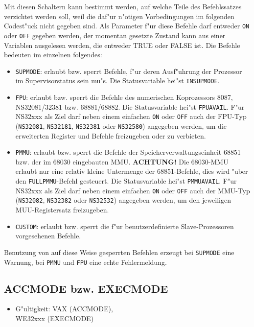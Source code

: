 \documentclass[12pt,a4paper,twoside]{report}
\makeatletter
\newcommand{\bb}[1]{{\bf #1}}
\newcommand{\tty}[1]{{\tt #1}}
\newcommand{\ttindex}[1]{\index{#1@{\tt #1}}}
\makeatother
\begin{document}
Mit diesen Schaltern kann bestimmt werden, auf welche Teile des
Befehlssatzes verzichtet werden soll, weil die daf"ur n"otigen
Vorbedingungen im folgenden Codest"uck nicht gegeben sind.  Als
Parameter f"ur diese Befehle darf entweder \tty{ON} oder \tty{OFF} gegeben werden,
der momentan gesetzte Zustand kann aus einer Variablen ausgelesen
werden, die entweder TRUE oder FALSE ist.  Die Befehle bedeuten im einzelnen
folgendes:
\begin{itemize}
\item{\tty{SUPMODE}: erlaubt bzw. sperrt Befehle, f"ur deren Ausf"uhrung
      der Prozessor im Supervisorstatus sein mu"s.  Die Statusvariable
      hei"st \tty{INSUPMODE}.}
\item{\tty{FPU}: erlaubt bzw. sperrt die Befehle des numerischen Koprozessors
      8087, NS32081/32381 bzw. 68881/68882.  Die Statusvariable hei"st \tty{FPUAVAIL}.
      F"ur NS32xxx als Ziel darf neben einem einfachen \tty{ON} oder \tty{OFF}
      auch der FPU-Typ (\tty{NS32081}, \tty{NS32181}, \tty{NS32381} oder \tty{NS32580})
      angegeben werden, um die erweiterten Register und Befehle freizugeben oder
      zu verbieten.}
\item{\tty{PMMU}: erlaubt bzw. sperrt die Befehle der Speicherverwaltungseinheit
      68851 bzw. der im 68030 eingebauten MMU.  \bb{ACHTUNG!} Die 68030-MMU
      erlaubt nur eine relativ kleine Untermenge der 68851-Befehle, dies wird
      "uber den \tty{FULLPMMU}-Befehl gesteuert.  Die Statusvariable hei"st
      \tty{PMMUAVAIL}. F"ur NS32xxx als Ziel darf neben einem einfachen \tty{ON}
      oder \tty{OFF} auch der MMU-Typ (\tty{NS32082}, \tty{NS32382} oder \tty{NS32532})
      angegeben werden, um den jeweiligen MUU-Registersatz freizugeben.}
\item{\tty{CUSTOM}: erlaubt bzw. sperrt die f"ur benutzerdefinierte Slave-Prozessoren
      vorgesehenen Befehle.}
\end{itemize}
Benutzung von auf diese Weise gesperrten Befehlen erzeugt bei \tty{SUPMODE}
eine Warnung, bei \tty{PMMU} und \tty{FPU} eine echte Fehlermeldung.


\subsection{ACCMODE bzw. EXECMODE}
\ttindex{ACCMODE}
\ttindex{EXECMODE}

{\em
\begin{itemize}
\item{G"ultigkeit: VAX (ACCMODE),\\
      WE32xxx (EXECMODE)}
\end{itemize}
}
\end{document}
